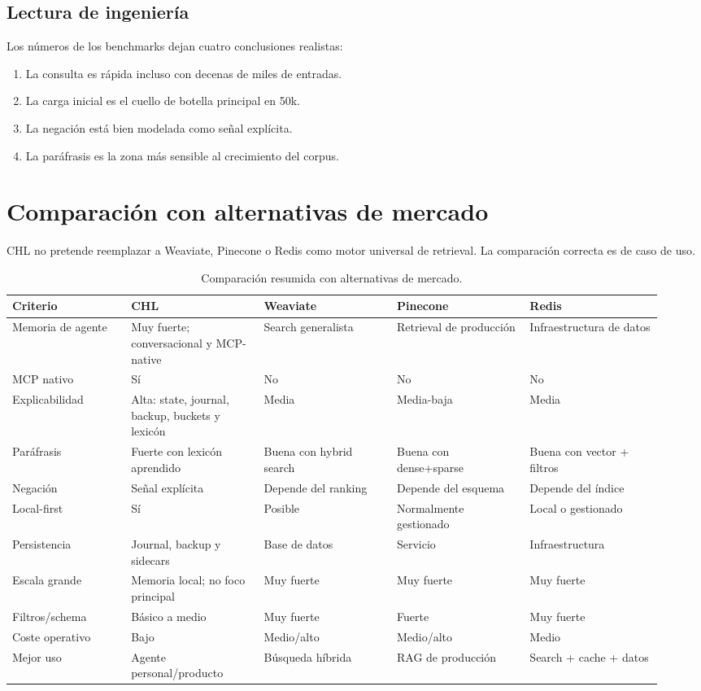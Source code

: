 \documentclass[11pt]{article}
\newcommand{\CHL}{\textsc{CHL}}
\newcommand{\MCP}{\textsc{MCP}}
\begin{document}
\subsection{Lectura de ingeniería}

Los números de los benchmarks dejan cuatro conclusiones realistas:
\begin{enumerate}
  \item La consulta es rápida incluso con decenas de miles de entradas.
  \item La carga inicial es el cuello de botella principal en 50k.
  \item La negación está bien modelada como señal explícita.
  \item La paráfrasis es la zona más sensible al crecimiento del corpus.
\end{enumerate}

\section{Comparación con alternativas de mercado}

\CHL{} no pretende reemplazar a Weaviate, Pinecone o Redis como motor universal de retrieval. La comparación correcta es de caso de uso.

\begin{table}[p]
\centering
\small
\begin{tabular}{p{0.17\linewidth}p{0.19\linewidth}p{0.19\linewidth}p{0.19\linewidth}p{0.19\linewidth}}
\toprule
\textbf{Criterio} & \textbf{CHL} & \textbf{Weaviate} & \textbf{Pinecone} & \textbf{Redis} \\
\midrule
Memoria de agente & Muy fuerte; conversacional y \MCP{}-native & Search generalista & Retrieval de producción & Infraestructura de datos \\
\MCP{} nativo & Sí & No & No & No \\
Explicabilidad & Alta: state, journal, backup, buckets y lexicón & Media & Media-baja & Media \\
Paráfrasis & Fuerte con lexicón aprendido & Buena con hybrid search & Buena con dense+sparse & Buena con vector + filtros \\
Negación & Señal explícita & Depende del ranking & Depende del esquema & Depende del índice \\
Local-first & Sí & Posible & Normalmente gestionado & Local o gestionado \\
Persistencia & Journal, backup y sidecars & Base de datos & Servicio & Infraestructura \\
Escala grande & Memoria local; no foco principal & Muy fuerte & Muy fuerte & Muy fuerte \\
Filtros/schema & Básico a medio & Muy fuerte & Fuerte & Muy fuerte \\
Coste operativo & Bajo & Medio/alto & Medio/alto & Medio \\
Mejor uso & Agente personal/producto & Búsqueda híbrida & RAG de producción & Search + cache + datos \\
\bottomrule
\end{tabular}
\caption{Comparación resumida con alternativas de mercado.}
\end{table}
\end{document}
